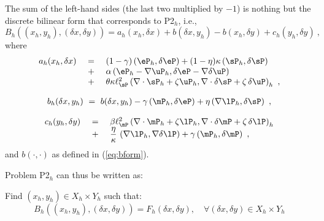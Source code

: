 The sum of the left-hand sides (the last two multiplied by $-1$) is nothing but the discrete bilinear form that corresponds to P2$_h$, i.e.,
\begin{equation}
B_h((x_h,y_h),(\delta x,\delta y))=a_h(x_h,\delta x)+b(\delta x,y_h)-b(x_h,\delta y)+c_h(y_h,\delta y)~,
\end{equation}
where
\begin{equation}
	\begin{array}{rcl}
		a_h(x_h,\delta x)~&=&~(1-\gamma)\left (\eP_h,\delta \eP\right )+(1-\eta)\kappa \left ( \sP_h,\delta \sP \right ) \\
		~&+&~\alpha \left( \eP_h-\nabla \uP_h, \delta \eP - \nabla \delta \uP \right)\\
		~&+&~ \theta \kappa \ell_{\sP}^2  \left ( \nabla \cdot \sP_h + \zeta \uP_h , \nabla \cdot \delta \sP + \zeta \, \delta \uP \right )_h~,
	\end{array}
\end{equation}

\begin{equation}
	\begin{aligned}
		b_h(\delta x,y_h)~=~b(\delta x,y_h)-\gamma \left (\mP_h,\delta \eP\right )+\eta \left (\nabla \lP_h,\delta \sP \right ) ~,
	\end{aligned}
\end{equation}

\begin{equation}
	\begin{array}{rcl}
		c_h(y_h,\delta y) ~&=&~  \beta \ell_{\mP}^2 \left ( \nabla \cdot \mP_h + \zeta \lP_h , \nabla \cdot \delta \mP + \zeta\,\delta \lP \right )_h \\
		~&+&~\dfrac{\eta}{\kappa}\,\left ( \nabla \lP_h,\nabla \delta \lP \right ) + \gamma \left ( \mP_h,\delta \mP \right )~,
	\end{array}
\end{equation}
and $b(\cdot,\cdot)$ as defined in (\ref{eq:bform}).

Problem P2$_h$ can thus be written as:

\begin{tcolorbox}[colback=black!10!white, boxrule=0pt, halign=justify]
	Find $(x_h,y_h)\in X_h \times Y_h$ such that:
	\begin{equation}
		B_h\left ( \left ( x_h,y_h \right ),\left ( \delta x,\delta y \right ) \right )= F_h(\delta x,\delta y), \quad \forall (\delta x, \delta y)\in X_h\times Y_h
		\label{eq:BzF}
	\end{equation}
\end{tcolorbox}

